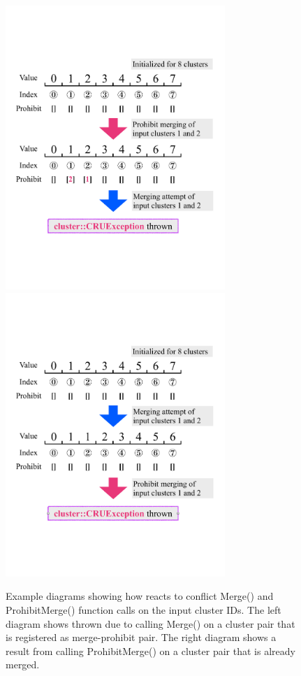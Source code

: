 \begin{figure}[ht]\begin{center}
\includegraphics[width=8.3cm]{./src/Pictures/CBookKeeperProhibitExample2.pdf}
\includegraphics[width=8.3cm]{./src/Pictures/CBookKeeperProhibitExample1.pdf}
\caption{Example diagrams showing how {\cbkeeper} reacts to conflict {\ttfamily Merge()} and {\ttfamily ProhibitMerge()} function calls on the input cluster IDs. The left diagram shows {\crue} thrown due to calling {\ttfamily Merge()} on a cluster pair that is registered as merge-prohibit pair. The right diagram shows a result from calling {\ttfamily ProhibitMerge()} on a cluster pair that is already merged.}
\label{sec:fmwk:base:cbk_prohibit}
\end{center}\end{figure}

